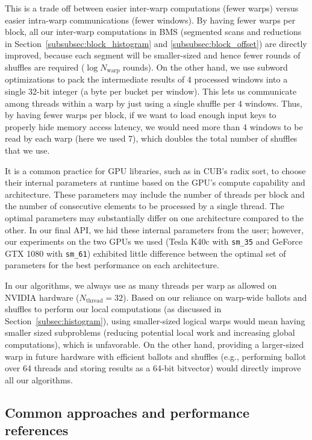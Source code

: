 This is a trade off between easier inter-warp computations (fewer warps) versus easier intra-warp communications (fewer windows).
By having fewer warps per block, all our inter-warp computations in BMS (segmented scans and reductions in Section~\ref{subsubsec:block_histogram} and \ref{subsubsec:block_offset}) are directly improved, because each segment will be smaller-sized and hence fewer rounds of shuffles are required ($\log{N_\text{warp}}$ rounds).
On the other hand, we use subword optimizations to pack the intermediate results of 4 processed windows into a single 32-bit integer (a byte per bucket per window). This lets us communicate among threads within a warp by just using a single shuffle per 4 windows.
Thus, by having fewer warps per block, if we want to load enough input keys to properly hide memory access latency, we would need more than 4 windows to be read by each warp (here we used 7), which doubles the total number of shuffles that we use.

It is a common practice for GPU libraries, such as in CUB's radix sort, to choose their internal parameters at runtime based on the GPU's compute capability and architecture.
These parameters may include the number of threads per block and the number of consecutive elements to be processed by a single thread.
The optimal parameters may substantially differ on one architecture compared to the other.
In our final API, we hid these internal parameters from the user; however, our experiments on the two GPUs we used (Tesla K40c with \texttt{sm\_35} and GeForce GTX 1080 with \texttt{sm\_61}) exhibited little difference between the optimal set of parameters for the best performance on each architecture.

In our algorithms, we always use as many threads per warp as allowed on NVIDIA  hardware ($N_\text{thread} = 32$).
Based on our reliance on warp-wide ballots and shuffles to perform our local computations (as discussed in Section~\ref{subsec:histogram}), using smaller-sized logical warps would mean having smaller sized subproblems (reducing potential local work and increasing global computations), which is unfavorable.
On the other hand, providing a larger-sized warp in future hardware with efficient ballots and shuffles (e.g., performing ballot over 64 threads and storing results as a 64-bit bitvector) would directly improve all our algorithms.
\subsection{Common approaches and performance references}\label{subsec:perf_references}
